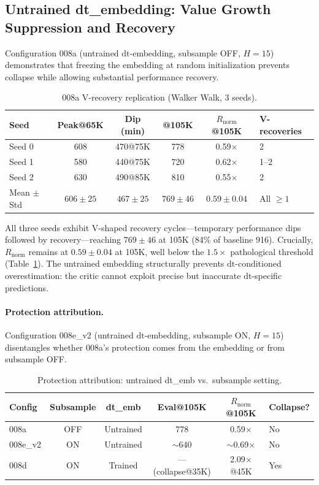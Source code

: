 \documentclass[10pt,letterpaper]{article}
\begin{document}
\subsection{Untrained dt\_embedding: Value Growth Suppression and Recovery}
\label{sec:untrained}

Configuration 008a (untrained $\mathrm{dt}$-embedding, subsample OFF, $H{=}15$) demonstrates that freezing the embedding at random initialization prevents collapse while allowing substantial performance recovery.

\begin{table}[h]
\centering
\caption{008a V-recovery replication (Walker Walk, 3 seeds).}
\label{tab:008a_seeds}
\begin{tabular}{lccccl}
\toprule
\textbf{Seed} & Peak@65K & Dip (min) & @105K & $R_{\text{norm}}$@105K & V-recoveries \\
\midrule
Seed 0 & 608 & 470@75K & 778 & 0.59$\times$ & 2 \\
Seed 1 & 580 & 440@75K & 720 & 0.62$\times$ & 1--2 \\
Seed 2 & 630 & 490@85K & 810 & 0.55$\times$ & 2 \\
\midrule
Mean $\pm$ Std & $606 \pm 25$ & $467 \pm 25$ & $769 \pm 46$ & $0.59 \pm 0.04$ & All $\geq 1$ \\
\bottomrule
\end{tabular}
\end{table}

All three seeds exhibit V-shaped recovery cycles---temporary performance dips followed by recovery---reaching $769 \pm 46$ at 105K (84\% of baseline 916). Crucially, $R_{\text{norm}}$ remains at $0.59 \pm 0.04$ at 105K, well below the $1.5\times$ pathological threshold (Table~\ref{tab:008a_seeds}). The untrained embedding structurally prevents $\mathrm{dt}$-conditioned overestimation: the critic cannot exploit precise but inaccurate $\mathrm{dt}$-specific predictions.

\paragraph{Protection attribution.} Configuration 008e\_v2 (untrained $\mathrm{dt}$-embedding, subsample ON, $H{=}15$) disentangles whether 008a's protection comes from the embedding or from subsample OFF.

\begin{table}[h]
\centering
\caption{Protection attribution: untrained dt\_emb vs.\ subsample setting.}
\label{tab:protection}
\begin{tabular}{lccccl}
\toprule
\textbf{Config} & Subsample & dt\_emb & Eval@105K & $R_{\text{norm}}$@105K & Collapse? \\
\midrule
008a & OFF & Untrained & 778 & 0.59$\times$ & No \\
008e\_v2 & ON & Untrained & $\sim$640 & $\sim$0.69$\times$ & No \\
008d & ON & Trained & --- (collapse@35K) & 2.09$\times$@45K & Yes \\
\bottomrule
\end{tabular}
\end{table}
\end{document}
